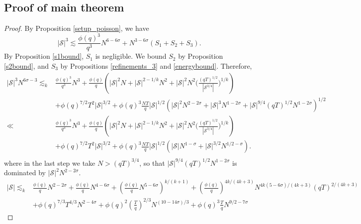\subsection{Proof of main theorem}
\begin{proof}
    By Proposition \ref{setup_poisson}, we have\[
        |\mathcal{S}|^3\lesssim \frac{\phi(q)^3}{q^3}N^{6-6\sigma}+ N^{3-6\sigma}(S_1+S_2+S_3).
    \]
    By Proposition \ref{s1bound}, $S_1$ is negligible. We bound $S_2$ by Proposition \ref{s2bound}, and $S_3$ by Propositions \ref{refinements_3} and \ref{energybound}. Therefore, \begin{align*}
        |\mathcal{S}|^3N^{6\sigma-3}\lesssim_k &\frac{\phi(q)^3}{q^3}N^{3}+ \frac{\phi(q)}{q}\left(|\mathcal{S}|^2N+|\mathcal{S}|^{2-1/k}N^2+|\mathcal{S}|^2N^2\Big(\frac{(qT)^{1/2}}{|\mathcal{S}^{3/4}|}\Big)^{1/k}\right)\\
        &+\phi(q)^{7/2}T^2|\mathcal{S}|^{3/2}+\phi(q)^{3}\frac{NT}{q}|\mathcal{S}|^{1/2}(|\mathcal{S}|^2N^{2-2\sigma}+ |\mathcal{S}|^3N^{1-2\sigma} + |\mathcal{S}|^{9/4}(qT)^{1/2}N^{{1-2\sigma}})^{1/2}\\
        \ll &\frac{\phi(q)^3}{q^3}N^{3}+ \frac{\phi(q)}{q}\left(|\mathcal{S}|^2N+|\mathcal{S}|^{2-1/k}N^2+|\mathcal{S}|^2N^2\Big(\frac{(qT)^{1/2}}{|\mathcal{S}^{3/4}|}\Big)^{1/k}\right)\\
        &+\phi(q)^{7/2}T^2|\mathcal{S}|^{3/2}+\phi(q)^{3}\frac{NT}{q}|\mathcal{S}|^{1/2}(|\mathcal{S}|N^{1-\sigma}+ |\mathcal{S}|^{3/2}N^{1/2-\sigma} ).\\
    \end{align*}
    where in the last step we take $N>(qT)^{3/4}$, so that $|\mathcal{S}|^{9/4}(qT)^{1/2}N^{{1-2\sigma}}$ is dominated by $|\mathcal{S}|^2N^{2-2\sigma}$. 
    \begin{align*}
        |\mathcal{S}|\lesssim_k & \frac{\phi(q)}{q}N^{2-2\sigma} + \frac{\phi(q)}{q}N^{4-6\sigma} + \left(\frac{\phi(q)}{q} N^{5-6\sigma}\right)^{k/(k+1)}+\left(\frac{\phi(q)}{q}\right)^{4k/(4k+3)}N^{4k(5-6\sigma)/(4k+3)}(qT)^{2/(4k+3)}\\
        & + {\phi(q)}^{7/3}T^{4/3}N^{2-4\sigma}+\phi(q)^{2}\left(\frac{T}{q}\right)^{2/3}N^{(10-14\sigma)/3}  +\phi(q)^{3}\frac{T}{q}N^{9/2-7\sigma} 
    \end{align*}

\end{proof}